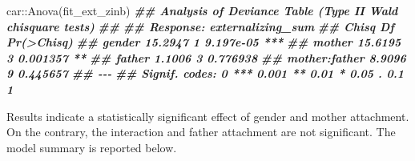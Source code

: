 \documentclass[
]{book}
\newenvironment{Shaded}{\begin{snugshade}}{\end{snugshade}}
\newcommand{\DocumentationTok}[1]{\textcolor[rgb]{0.56,0.35,0.01}{\textbf{\textit{#1}}}}
\newcommand{\FunctionTok}[1]{\textcolor[rgb]{0.00,0.00,0.00}{#1}}
\newcommand{\NormalTok}[1]{#1}
\newcommand{\SpecialCharTok}[1]{\textcolor[rgb]{0.00,0.00,0.00}{#1}}
\begin{document}
\begin{Shaded}
\begin{Highlighting}[]
\NormalTok{car}\SpecialCharTok{::}\FunctionTok{Anova}\NormalTok{(fit\_ext\_zinb)}
\DocumentationTok{\#\# Analysis of Deviance Table (Type II Wald chisquare tests)}
\DocumentationTok{\#\# }
\DocumentationTok{\#\# Response: externalizing\_sum}
\DocumentationTok{\#\#                 Chisq Df Pr(\textgreater{}Chisq)    }
\DocumentationTok{\#\# gender        15.2947  1  9.197e{-}05 ***}
\DocumentationTok{\#\# mother        15.6195  3   0.001357 ** }
\DocumentationTok{\#\# father         1.1006  3   0.776938    }
\DocumentationTok{\#\# mother:father  8.9096  9   0.445657    }
\DocumentationTok{\#\# {-}{-}{-}}
\DocumentationTok{\#\# Signif. codes:  0 \textquotesingle{}***\textquotesingle{} 0.001 \textquotesingle{}**\textquotesingle{} 0.01 \textquotesingle{}*\textquotesingle{} 0.05 \textquotesingle{}.\textquotesingle{} 0.1 \textquotesingle{} \textquotesingle{} 1}
\end{Highlighting}
\end{Shaded}

Results indicate a statistically significant effect of gender and mother attachment. On the contrary, the interaction and father attachment are not significant. The model summary is reported below.
\end{document}
